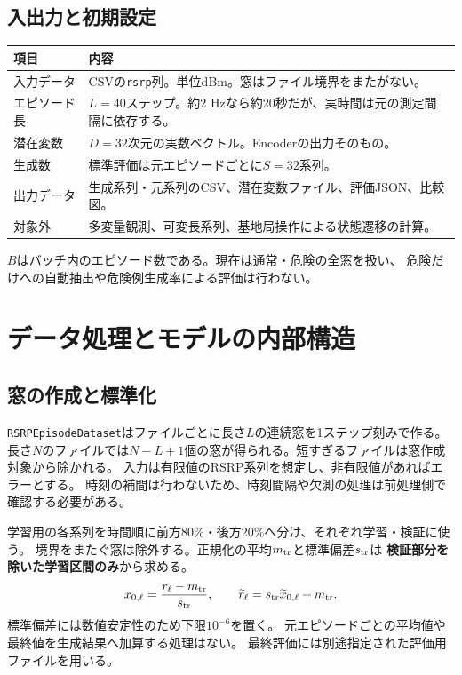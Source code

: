 \documentclass[a4paper,10pt]{article}
\begin{document}
\subsection{入出力と初期設定}
\begin{center}\small
\begin{tabularx}{\linewidth}{@{}lY@{}}\toprule
項目 & 内容\\\midrule
入力データ & CSVの\texttt{rsrp}列。単位dBm。窓はファイル境界をまたがない。\\
エピソード長 & $L=40$ステップ。約2 Hzなら約20秒だが、実時間は元の測定間隔に依存する。\\
潜在変数 & $D=32$次元の実数ベクトル。Encoderの出力そのもの。\\
生成数 & 標準評価は元エピソードごとに$S=32$系列。\\
出力データ & 生成系列・元系列のCSV、潜在変数ファイル、評価JSON、比較図。\\
対象外 & 多変量観測、可変長系列、基地局操作による状態遷移の計算。\\\bottomrule
\end{tabularx}\end{center}
$B$はバッチ内のエピソード数である。現在は通常・危険の全窓を扱い、
危険だけへの自動抽出や危険例生成率による評価は行わない。

\newpage
\section{データ処理とモデルの内部構造}
\subsection{窓の作成と標準化}
\texttt{RSRPEpisodeDataset}はファイルごとに長さ$L$の連続窓を1ステップ刻みで作る。
長さ$N$のファイルでは$N-L+1$個の窓が得られる。短すぎるファイルは窓作成対象から除かれる。
入力は有限値のRSRP系列を想定し、非有限値があればエラーとする。
時刻の補間は行わないため、時刻間隔や欠測の処理は前処理側で確認する必要がある。

学習用の各系列を時間順に前方80\%・後方20\%へ分け、それぞれ学習・検証に使う。
境界をまたぐ窓は除外する。正規化の平均$m_{\rm tr}$と標準偏差$s_{\rm tr}$は
\textbf{検証部分を除いた学習区間のみ}から求める。
\[
 x_{0,\ell}=\frac{r_\ell-m_{\rm tr}}{s_{\rm tr}},\qquad
 \widetilde r_\ell=s_{\rm tr}\widetilde x_{0,\ell}+m_{\rm tr}.
\]
標準偏差には数値安定性のため下限$10^{-6}$を置く。
元エピソードごとの平均値や最終値を生成結果へ加算する処理はない。
最終評価には別途指定された評価用ファイルを用いる。
\end{document}
